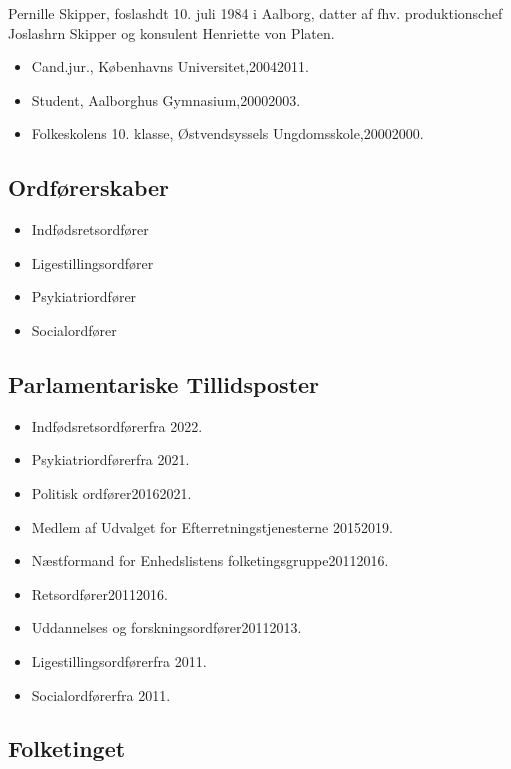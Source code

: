 \documentclass[11pt, a4paper]{awesome-cv}
\begin{document}
\makecvheader[R]
\makelettertitle
\begin{cvletter}
Pernille Skipper, foslashdt 10. juli 1984 i Aalborg, datter af fhv. produktionschef Joslashrn Skipper og konsulent Henriette von Platen.

\begin{itemize}
\item Cand.jur., Københavns Universitet,20042011.
\item Student, Aalborghus Gymnasium,20002003.
\item Folkeskolens 10. klasse, Østvendsyssels Ungdomsskole,20002000.
\end{itemize}
\subsection*{Ordførerskaber}
\begin{itemize}
\item Indfødsretsordfører
\item Ligestillingsordfører
\item Psykiatriordfører
\item Socialordfører
\end{itemize}
\subsection*{Parlamentariske Tillidsposter}
\begin{itemize}
\item Indfødsretsordførerfra 2022.
\item Psykiatriordførerfra 2021.
\item Politisk ordfører20162021.
\item Medlem af Udvalget for Efterretningstjenesterne 20152019.
\item Næstformand for Enhedslistens folketingsgruppe20112016.
\item Retsordfører20112016.
\item Uddannelses og forskningsordfører20112013.
\item Ligestillingsordførerfra 2011.
\item Socialordførerfra 2011.
\end{itemize}
\subsection*{Folketinget}

\end{cvletter}
\end{document}
